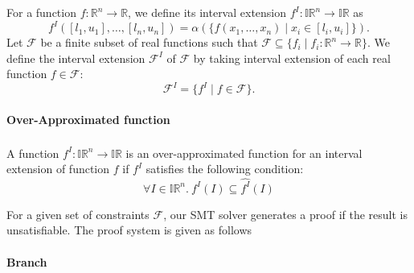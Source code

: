 \documentclass[envcountsect]{llncs}
\begin{document}
For a function $f : \mathbb{R}^n \to \mathbb{R}$, we define its
interval extension $f^I : \mathbb{IR}^n \to \mathbb{IR}$ as
\[
f^I ([l_1, u_1], \dots, [l_n, u_n]) =
\alpha(\{ f(x_1, \dots, x_n) \mid x_i  \in [l_i, u_i] \}).
\]
Let $\mathcal{F}$ be a finite subset of real functions such that
$\mathcal{F} \subseteq \{f_i \mid f_i : \mathbb{R}^n \to \mathbb{R}
\}$. We define the interval extension $\mathcal{F}^I$ of $\mathcal{F}$
by taking interval extension of each real function $f \in
\mathcal{F}$:
\[
\mathcal{F}^I = \{ f^I \mid f \in \mathcal{F} \}.
\]

\paragraph{Over-Approximated  function}

A function $\widehat{f^I} : \mathbb{IR}^n \to \mathbb{IR}$ is an
over-approximated function for an interval extension of function $f$ if
$f^I$ satisfies the following condition:
\[
\forall I \in \mathbb{IR}^n. \
f^I(I) \subseteq \widehat{f^I}(I)
\]


For a given set of constraints $\mathcal{F}$, our SMT solver
generates a proof if the result is unsatisfiable. The proof system is
given as follows

\paragraph{Branch}
\begin{mathpar}
\end{mathpar}
\end{document}

